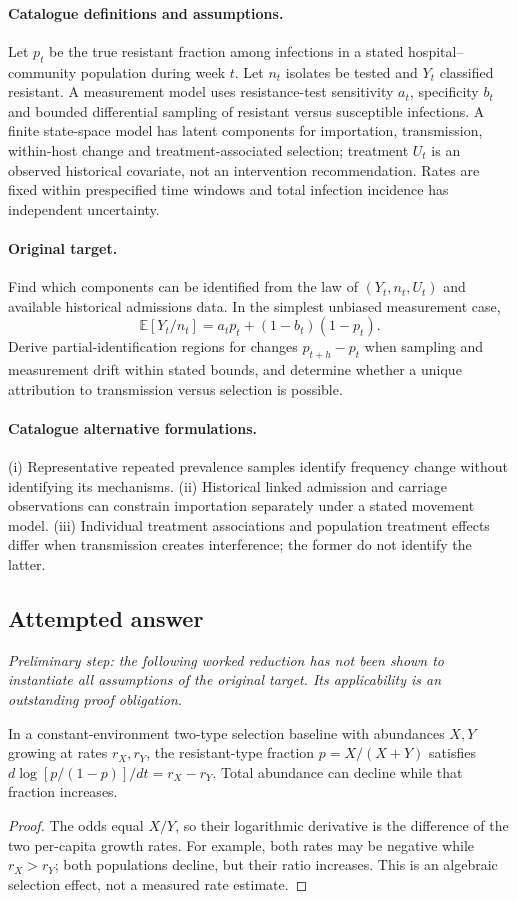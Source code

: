 \documentclass[11pt]{article}
\begin{document}
\paragraph{Catalogue definitions and assumptions.}
Let $p_t$ be the true resistant fraction among infections in a stated hospital--community population during week $t$. Let $n_t$ isolates be tested and $Y_t$ classified resistant. A measurement model uses resistance-test sensitivity $a_t$, specificity $b_t$ and bounded differential sampling of resistant versus susceptible infections. A finite state-space model has latent components for importation, transmission, within-host change and treatment-associated selection; treatment $U_t$ is an observed historical covariate, not an intervention recommendation. Rates are fixed within prespecified time windows and total infection incidence has independent uncertainty.
\paragraph{Original target.}
Find which components can be identified from the law of $(Y_t,n_t,U_t)$ and available historical admissions data. In the simplest unbiased measurement case,
    \[\mathbb{E}[Y_t/n_t]=a_tp_t+(1-b_t)(1-p_t).\]
    Derive partial-identification regions for changes $p_{t+h}-p_t$ when sampling and measurement drift within stated bounds, and determine whether a unique attribution to transmission versus selection is possible.
\paragraph{Catalogue alternative formulations.}
(i) Representative repeated prevalence samples identify frequency change without identifying its mechanisms. (ii) Historical linked admission and carriage observations can constrain importation separately under a stated movement model. (iii) Individual treatment associations and population treatment effects differ when transmission creates interference; the former do not identify the latter.
\subsection{Attempted answer}
\noindent\emph{Preliminary step: the following worked reduction has not been shown to instantiate all assumptions of the original target. Its applicability is an outstanding proof obligation.}

\begin{proposition}
In a constant-environment two-type selection baseline with abundances $X,Y$ growing at rates $r_X,r_Y$, the resistant-type fraction $p=X/(X+Y)$ satisfies $d\log[p/(1-p)]/dt=r_X-r_Y$. Total abundance can decline while that fraction increases.
\end{proposition}
\begin{proof}
The odds equal $X/Y$, so their logarithmic derivative is the difference of the two per-capita growth rates. For example, both rates may be negative while $r_X>r_Y$; both populations decline, but their ratio increases. This is an algebraic selection effect, not a measured rate estimate.
\end{proof}
\end{document}
